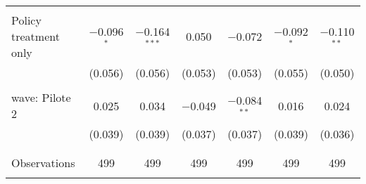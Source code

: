 \begin{tabular}{@{\extracolsep{5pt}}lcccccc}
  & & & & & & \\ 
 Policy treatment only & $-$0.096$^{*}$ & $-$0.164$^{***}$ & 0.050 & $-$0.072 & $-$0.092$^{*}$ & $-$0.110$^{**}$ \\ 
  & (0.056) & (0.056) & (0.053) & (0.053) & (0.055) & (0.050) \\ 
  & & & & & & \\ 
 wave: Pilote 2 & 0.025 & 0.034 & $-$0.049 & $-$0.084$^{**}$ & 0.016 & 0.024 \\ 
  & (0.039) & (0.039) & (0.037) & (0.037) & (0.039) & (0.036) \\ 
  & & & & & & \\ 
\hline \\[-1.8ex] 

Observations & 499 & 499 & 499 & 499 & 499 & 499 \\ 
\hline 
\hline \\[-1.8ex] 
\end{tabular} 